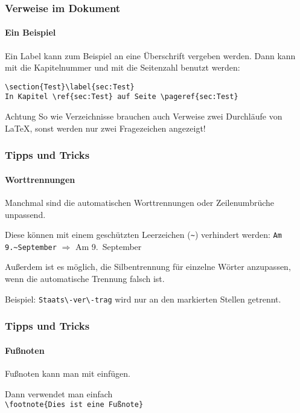 \begin{frame}[fragile]
    \frametitle{Verweise im Dokument}
    \framesubtitle{Ein Beispiel}
    Ein Label kann zum Beispiel an eine Überschrift vergeben werden. Dann kann mit  die Kapitelnummer und mit  die Seitenzahl benutzt werden:
    \bigskip
    \pause

    \begin{verbatim}
\section{Test}\label{sec:Test}
In Kapitel \ref{sec:Test} auf Seite \pageref{sec:Test}
    \end{verbatim}
    
    \pause
    \begin{alertblock}{Achtung}
        So wie Verzeichnisse brauchen auch Verweise zwei Durchläufe von \LaTeX{}, sonst werden nur zwei Fragezeichen angezeigt!
    \end{alertblock}
\end{frame}


\begin{frame}[fragile]
    \frametitle{Tipps und Tricks}
    \framesubtitle{Worttrennungen}
    Manchmal sind die automatischen Worttrennungen oder Zeilenumbrüche unpassend.
    \medskip\pause
    
    Diese können mit einem geschützten Leerzeichen (\texttt{\~{}}) verhindert werden: \verb+Am 9.~September+ $\Rightarrow$ Am 9.~September
    
    \medskip\pause
    Außerdem ist es möglich, die Silbentrennung für einzelne Wörter anzupassen, wenn die automatische Trennung falsch ist.
    \smallskip
    
    Beispiel: \verb+Staats\-ver\-trag+ wird nur an den markierten Stellen getrennt.
\end{frame}

\begin{frame}[fragile]
    \frametitle{Tipps und Tricks}
    \framesubtitle{Fußnoten}
    Fußnoten kann man mit  einfügen.
    
    \bigskip
    Dann verwendet man einfach\\
    \verb|\footnote{Dies ist eine Fußnote}|
\end{frame}
